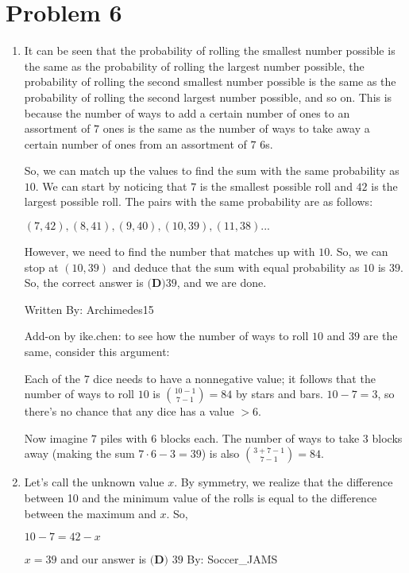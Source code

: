 \documentclass{article}%
\begin{document}
\section*{Problem 6}%
\label{sec:Problem6}%
\begin{enumerate}%
\item%
It can be seen that the probability of rolling the smallest number possible is the same as the probability of rolling the largest number possible, the probability of rolling the second smallest number possible is the same as the probability of rolling the second largest number possible, and so on. This is because the number of ways to add a certain number of ones to an assortment of $7$ ones is the same as the number of ways to take away a certain number of ones from an assortment of $7$ $6$s.

So, we can match up the values to find the sum with the same probability as $10$. We can start by noticing that $7$ is the smallest possible roll and $42$ is the largest possible roll. The pairs with the same probability are as follows:

$(7, 42), (8, 41), (9, 40), (10, 39), (11, 38)...$

However, we need to find the number that matches up with $10$. So, we can stop at $(10, 39)$ and deduce that the sum with equal probability as $10$ is $39$. So, the correct answer is $\boxed{\textbf{(D)} \text{39}}$, and we are done.

Written By: Archimedes15



Add-on by ike.chen: to see how the number of ways to roll $10$ and $39$ are the same, consider this argument:

Each of the $7$ dice needs to have a nonnegative value; it follows that the number of ways to roll $10$ is $\binom {10-1}{7-1}=84$ by stars and bars. $10-7=3$, so there's no chance that any dice has a value $>6$.

Now imagine $7$ piles with $6$ blocks each. The number of ways to take $3$ blocks away (making the sum $7\cdot 6-3=39$) is also $\binom {3+7-1}{7-1}=84$.

%
\item%
Let's call the unknown value $x$. By symmetry, we realize that the difference between 10 and the minimum value of the rolls is equal to the difference between the maximum and $x$. So, 

$10 - 7 = 42- x$

$x = 39$ and our answer is  $\boxed{\textbf{(D)} \text{ 39}}$
By: Soccer\_JAMS


\end{enumerate}
\end{document}
